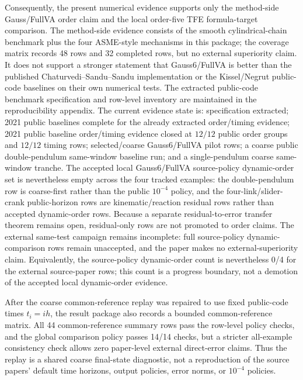 \documentclass[preprint,12pt]{elsarticle}
\newcommand{\method}{Gauss6\slash FullVA}
\newcommand{\tfe}{TFE}
\begin{document}
Consequently, the present numerical evidence supports only the method-side
Gauss/FullVA order claim and the local order-five \tfe{} formula-target
comparison. The method-side evidence consists of the smooth cylindrical-chain
benchmark plus the four ASME-style mechanisms in this package; the coverage
matrix records 48 rows and 32 completed rows, but no external superiority
claim. It does not support a stronger statement that \method{} is
better than the published Chaturvedi--Sandu--Sandu implementation or the
Kissel/Negrut public-code baselines on their own numerical tests. The extracted
public-code benchmark specification and row-level inventory are maintained in
the reproducibility appendix. The current evidence state is: specification
extracted; 2021 public baselines complete for the already extracted
order/timing evidence; 2021 public baseline order/timing evidence closed at
$12/12$ public order groups and $12/12$ timing rows; selected/coarse
\method{} pilot rows; a coarse public double-pendulum same-window baseline
run; and a single-pendulum coarse same-window tranche. The accepted local
\method{} source-policy dynamic-order set is nevertheless empty across the
four tracked examples: the double-pendulum row is coarse-first rather than the
public $10^{-4}$ policy,
and the four-link/slider-crank public-horizon rows are kinematic/reaction
residual rows rather than accepted dynamic-order rows. Because a separate
residual-to-error transfer theorem remains open, residual-only rows are not promoted to
order claims. The external same-test campaign remains incomplete:
full source-policy dynamic-comparison rows remain unaccepted, and the paper
makes no external-superiority claim.
Equivalently, the source-policy dynamic-order count is nevertheless 0/4 for
the external source-paper rows; this count is a progress boundary, not a
demotion of the accepted local dynamic-order evidence.

After the coarse common-reference replay was repaired to use fixed public-code
times $t_i=i h$, the result package also records a bounded
common-reference matrix. All 44 common-reference summary rows pass the
row-level policy checks, and the global comparison policy passes 14/14
checks, but a stricter all-example consistency check allows zero paper-level
external direct-error claims. Thus the replay is a shared coarse
final-state diagnostic, not a reproduction of the source papers' default
time horizons, output policies, error norms, or $10^{-4}$ policies.
\end{document}

